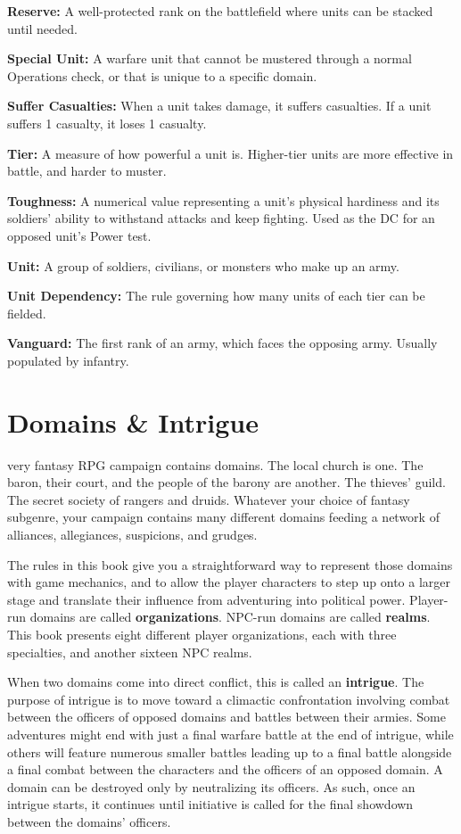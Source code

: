 \documentclass[10pt,a4paper,twoside,bg=print,twocolumn,openany,nodeprecatedcode]{dndbook}
\begin{document}
\textbf{Reserve:} A well-protected rank on the battlefield where units can be stacked until needed.

\textbf{Special Unit:} A warfare unit that cannot be mustered through a normal Operations check, or that is unique to a specific domain.

\textbf{Suffer Casualties:} When a unit takes damage, it suffers casualties. If a unit suffers 1 casualty, it loses 1 casualty.

\textbf{Tier:} A measure of how powerful a unit is. Higher-tier units are more effective in battle, and harder to muster.

\textbf{Toughness:} A numerical value representing a unit's physical hardiness and its soldiers' ability to withstand attacks and keep fighting. Used as the DC for an opposed unit's Power test.

\textbf{Unit:} A group of soldiers, civilians, or monsters who make up an army.

\textbf{Unit Dependency:} The rule governing how many units of each tier can be fielded.

\textbf{Vanguard:} The first rank of an army, which faces the opposing army. Usually populated by infantry.

\chapter{Domains \& Intrigue}
very fantasy RPG campaign contains domains. The local church is one. The baron, their court, and the people of the barony are another. The thieves' guild. The secret society of rangers and druids. Whatever your choice of fantasy subgenre, your campaign contains many different domains feeding a network of alliances, allegiances, suspicions, and grudges.


The rules in this book give you a straightforward way to represent those domains with game mechanics, and to allow the player characters to step up onto a larger stage and translate their influence from adventuring into political power. Player-run domains are called \textbf{organizations}. NPC-run domains are called \textbf{realms}. This book presents eight different player organizations, each with three specialties, and another sixteen NPC realms.

When two domains come into direct conflict, this is called an \textbf{intrigue}. The purpose of intrigue is to move toward a climactic confrontation involving combat between the officers of opposed domains and battles between their armies. Some adventures might end with just a final warfare battle at the end of intrigue, while others will feature numerous smaller battles leading up to a final battle alongside a final combat between the characters and the officers of an opposed domain. A domain can be destroyed only by neutralizing its officers. As such, once an intrigue starts, it continues until initiative is called for the final showdown between the domains' officers.
\end{document}
